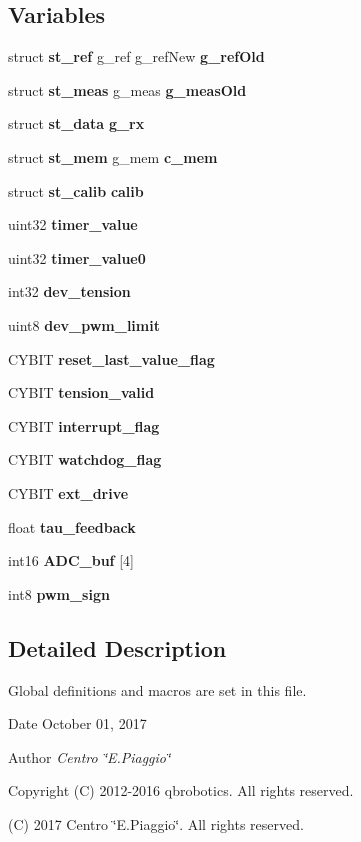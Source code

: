 \subsection*{Variables}
\begin{DoxyCompactItemize}
\item 
struct \textbf{ st\+\_\+ref} g\+\_\+ref g\+\_\+ref\+New \textbf{ g\+\_\+ref\+Old}
\item 
struct \textbf{ st\+\_\+meas} g\+\_\+meas \textbf{ g\+\_\+meas\+Old}
\item 
struct \textbf{ st\+\_\+data} \textbf{ g\+\_\+rx}
\item 
struct \textbf{ st\+\_\+mem} g\+\_\+mem \textbf{ c\+\_\+mem}
\item 
\mbox{\label{globals_8h_aed96fdd8308fe2c4fc07c3b5db1c7bbb}} 
struct \textbf{ st\+\_\+calib} {\bfseries calib}
\item 
uint32 \textbf{ timer\+\_\+value}
\item 
uint32 \textbf{ timer\+\_\+value0}
\item 
int32 \textbf{ dev\+\_\+tension}
\item 
uint8 \textbf{ dev\+\_\+pwm\+\_\+limit}
\item 
C\+Y\+B\+IT \textbf{ reset\+\_\+last\+\_\+value\+\_\+flag}
\item 
C\+Y\+B\+IT \textbf{ tension\+\_\+valid}
\item 
C\+Y\+B\+IT \textbf{ interrupt\+\_\+flag}
\item 
C\+Y\+B\+IT \textbf{ watchdog\+\_\+flag}
\item 
C\+Y\+B\+IT \textbf{ ext\+\_\+drive}
\item 
float \textbf{ tau\+\_\+feedback}
\item 
\mbox{\label{globals_8h_abb22f0a4462a0b4db27496654f2175a0}} 
int16 {\bfseries A\+D\+C\+\_\+buf} [4]
\item 
int8 \textbf{ pwm\+\_\+sign}
\end{DoxyCompactItemize}


\subsection{Detailed Description}
Global definitions and macros are set in this file. 

\begin{DoxyDate}{Date}
October 01, 2017 
\end{DoxyDate}
\begin{DoxyAuthor}{Author}
{\itshape Centro \char`\"{}\+E.\+Piaggio\char`\"{}} 
\end{DoxyAuthor}
\begin{DoxyCopyright}{Copyright}
(C) 2012-\/2016 qbrobotics. All rights reserved. 

(C) 2017 Centro \char`\"{}\+E.\+Piaggio\char`\"{}. All rights reserved. 
\end{DoxyCopyright}


